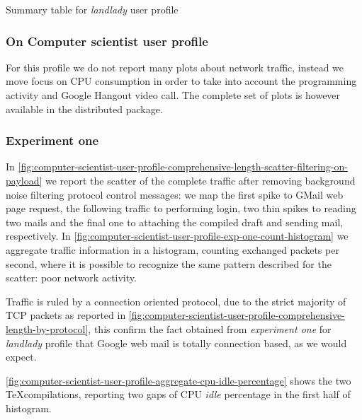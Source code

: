 \documentclass[10pt,a4paper]{article}
\begin{document}
    \begin{table}
      \begin{adjustwidth}{-2cm}{}
        
      \end{adjustwidth}
      \caption{Summary table for \emph{landlady} user profile}
      \label{fig:landlady-user-profile}
    \end{table}

    \newpage

    \subsubsection{On Computer scientist user profile}
    For this profile we do not report many plots about network
    traffic, instead we move focus on CPU consumption in order to take
    into account the programming activity and Google Hangout video
    call. The complete set of plots is however available in the
    distributed package.
    
    \subsubsection*{Experiment one}
    In
    \autoref{fig:computer-scientist-user-profile-comprehensive-length-scatter-filtering-on-payload}
    we report the scatter of the complete traffic after removing
    background noise filtering protocol control messages: we map the
    first spike to GMail web page request, the following traffic to
    performing login, two thin spikes to reading two mails and the
    final one to attaching the compiled draft and sending mail,
    respectively.  In
    \autoref{fig:computer-scientist-user-profile-exp-one-count-histogram}
    we aggregate traffic information in a histogram, counting
    exchanged packets per second, where it is possible to recognize
    the same pattern described for the scatter: poor network activity.

    Traffic is ruled by a connection oriented protocol, due to the
    strict majority of TCP packets as reported in
    \autoref{fig:computer-scientist-user-profile-comprehensive-length-by-protocol},
    this confirm the fact obtained from \emph{experiment one} for
    \emph{landlady} profile that Google web mail is totally connection
    based, as we would expect.
    
    \autoref{fig:computer-scientist-user-profile-aggregate-cpu-idle-percentage}
    shows the two \TeX compilations, reporting two gaps of CPU
    \emph{idle} percentage in the first half of histogram.
\end{document}
